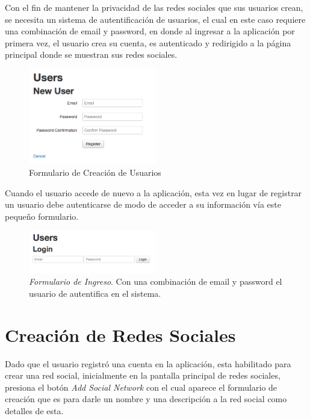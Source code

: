 Con el fin de mantener la privacidad de las redes sociales que sus usuarios crean, se necesita un sistema de autentificación de usuarios, el cual en este caso requiere una combinación de email y password, en donde al ingresar a la aplicación por primera vez, el usuario crea su cuenta, es autenticado y redirigido a la página principal donde se muestran sus redes sociales.

\begin{figure}[H]
  \centering
  \includegraphics[width=0.5\textwidth]{images/creacion_usuario.png}
  \caption{Formulario de Creación de Usuarios}
  \label{creacion_usuario}
\end{figure}

Cuando el usuario accede de nuevo a la aplicación, esta vez en lugar de registrar un usuario debe autenticarse de modo de acceder a su información vía este pequeño formulario.

\begin{figure}[H]
  \centering
  \includegraphics[width=0.5\textwidth]{images/login.png}
  \caption[Formulario de Ingreso]{\emph{Formulario de Ingreso}. Con una combinación de email y password el usuario de autentifica en el sistema.}
  \label{login}
\end{figure}


\section{Creación de Redes Sociales} %
\label{sec:creacion_de_redes_sociales}

Dado que el usuario registró una cuenta en la aplicación, esta habilitado para crear una red social, inicialmente en la pantalla principal de redes sociales, presiona el botón \emph{Add Social Network} con el cual aparece el formulario de creación que es para darle un nombre y una descripción a la red social como detalles de esta.

